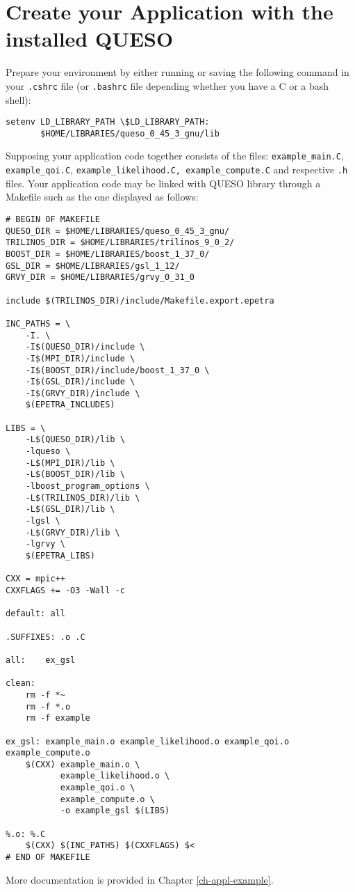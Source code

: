 \section{Create your Application with the installed QUESO} \label{sc-use-queso}

Prepare your environment by either running or saving the following command in your \verb+.cshrc+ file (or \verb+.bashrc+ file depending whether you have a C or a bash shell):

\begin{lstlisting}[label={},caption={}]
setenv LD_LIBRARY_PATH \$LD_LIBRARY_PATH:
       $HOME/LIBRARIES/queso_0_45_3_gnu/lib
\end{lstlisting}


Supposing your application code together consists of the files: \linebreak \verb+example_main.C+, \verb+example_qoi.C+,  \verb+example_likelihood.C, example_compute.C+ and respective \verb+.h+ files. Your application code may be linked with QUESO library through a Makefile such as the one displayed as follows:

\begin{lstlisting}[label={},caption={},deletekeywords={export,rm}]
# BEGIN OF MAKEFILE
QUESO_DIR = $HOME/LIBRARIES/queso_0_45_3_gnu/
TRILINOS_DIR = $HOME/LIBRARIES/trilinos_9_0_2/
BOOST_DIR = $HOME/LIBRARIES/boost_1_37_0/
GSL_DIR = $HOME/LIBRARIES/gsl_1_12/
GRVY_DIR = $HOME/LIBRARIES/grvy_0_31_0

include $(TRILINOS_DIR)/include/Makefile.export.epetra

INC_PATHS = \
	-I. \
	-I$(QUESO_DIR)/include \
	-I$(MPI_DIR)/include \
	-I$(BOOST_DIR)/include/boost_1_37_0 \
	-I$(GSL_DIR)/include \
	-I$(GRVY_DIR)/include \
	$(EPETRA_INCLUDES)

LIBS = \
	-L$(QUESO_DIR)/lib \
	-lqueso \
	-L$(MPI_DIR)/lib \
	-L$(BOOST_DIR)/lib \
	-lboost_program_options \
    -L$(TRILINOS_DIR)/lib \
	-L$(GSL_DIR)/lib \
	-lgsl \
	-L$(GRVY_DIR)/lib \
	-lgrvy \
	$(EPETRA_LIBS)

CXX = mpic++
CXXFLAGS += -O3 -Wall -c

default: all

.SUFFIXES: .o .C

all:	ex_gsl

clean:
	rm -f *~
	rm -f *.o
	rm -f example

ex_gsl: example_main.o example_likelihood.o example_qoi.o example_compute.o
	$(CXX) example_main.o \
	       example_likelihood.o \
	       example_qoi.o \
	       example_compute.o \
	       -o example_gsl $(LIBS)

%.o: %.C
	$(CXX) $(INC_PATHS) $(CXXFLAGS) $<
# END OF MAKEFILE
\end{lstlisting}

More documentation is provided in Chapter \ref{ch-appl-example}.
